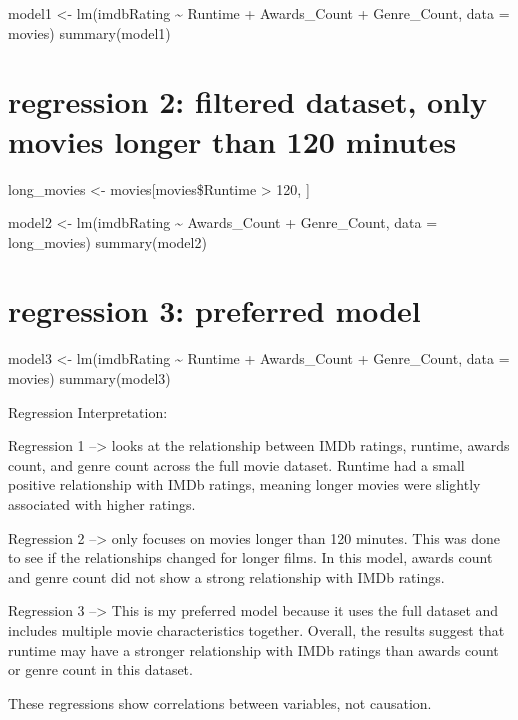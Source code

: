 \documentclass[
]{article}
\begin{document}
model1 \textless- lm(imdbRating \textasciitilde{} Runtime +
Awards\_Count + Genre\_Count, data = movies) summary(model1)

\section{regression 2: filtered dataset, only movies longer than 120
minutes}\label{regression-2-filtered-dataset-only-movies-longer-than-120-minutes}

long\_movies \textless- movies{[}movies\$Runtime \textgreater{} 120, {]}

model2 \textless- lm(imdbRating \textasciitilde{} Awards\_Count +
Genre\_Count, data = long\_movies) summary(model2)

\section{regression 3: preferred
model}\label{regression-3-preferred-model}

model3 \textless- lm(imdbRating \textasciitilde{} Runtime +
Awards\_Count + Genre\_Count, data = movies) summary(model3)

Regression Interpretation:

Regression 1 --\textgreater{} looks at the relationship between IMDb
ratings, runtime, awards count, and genre count across the full movie
dataset. Runtime had a small positive relationship with IMDb ratings,
meaning longer movies were slightly associated with higher ratings.

Regression 2 --\textgreater{} only focuses on movies longer than 120
minutes. This was done to see if the relationships changed for longer
films. In this model, awards count and genre count did not show a strong
relationship with IMDb ratings.

Regression 3 --\textgreater{} This is my preferred model because it uses
the full dataset and includes multiple movie characteristics together.
Overall, the results suggest that runtime may have a stronger
relationship with IMDb ratings than awards count or genre count in this
dataset.

These regressions show correlations between variables, not causation.
\end{document}

